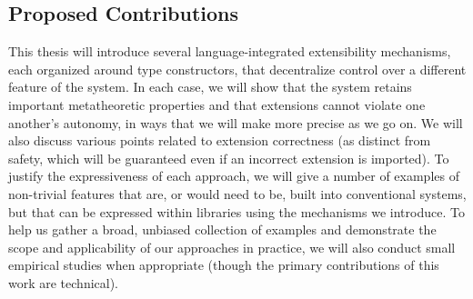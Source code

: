 

\subsection{Proposed Contributions}
This thesis will introduce several language-integrated extensibility mechanisms, each organized around type constructors, that decentralize control over a different feature of the system. In each case, we will show that the system retains important metatheoretic properties and that extensions cannot violate one another's autonomy, in ways that we will make more precise as we go on.  We will also discuss various points related to extension correctness (as distinct from safety, which will be guaranteed even if an incorrect extension is imported). To justify the  expressiveness of each approach, we will give a number of examples of non-trivial features that are, or would need to be, built into conventional systems, but that can be expressed within libraries using the mechanisms we introduce. To help us gather a broad, unbiased collection of examples and demonstrate the scope and applicability of our approaches in practice, we will also conduct small empirical studies when appropriate (though the primary contributions of this work are technical).

